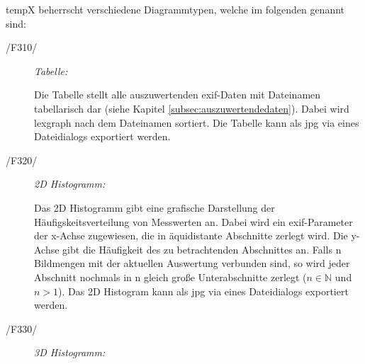 	\gls{tempX} beherrscht verschiedene Diagrammtypen, welche im folgenden genannt sind:
	\newpage
	\begin{description}

		\item[/F310/] \textit{Tabelle:}\par 
		
			\begin{figure}[H]
				\centering
			\end{figure}			
			Die Tabelle stellt alle auszuwertenden \gls{exif}-Daten mit Dateinamen tabellarisch dar (siehe Kapitel \ref{subsec:auszuwertendedaten}). Dabei wird \gls{lexgraph} nach dem Dateinamen sortiert. Die Tabelle kann als \gls{jpg} via eines Dateidialogs exportiert werden.

		\item[/F320/] \textit{2D Histogramm:}\par 
		
			\begin{figure}[H]
				\centering
			\end{figure}
			Das 2D Histogramm gibt eine grafische Darstellung der Häufigskeitsverteilung von Messwerten an. Dabei wird ein \gls{exif}-Parameter der x-Achse zugewiesen, die in äquidistante Abschnitte zerlegt wird. Die y-Achse gibt die Häufigkeit des zu betrachtenden Abschnittes an. Falls n Bildmengen mit der aktuellen Auswertung verbunden sind, so wird jeder Abschnitt nochmals in n gleich große Unterabschnitte zerlegt ($ n \in \mathbb{N} $ und $ n>1 $). Das 2D Histogram kann als \gls{jpg} via eines Dateidialogs exportiert werden.
			
\newpage
		\item[/F330/] \textit{3D Histogramm:}\par
			

\end{description}
